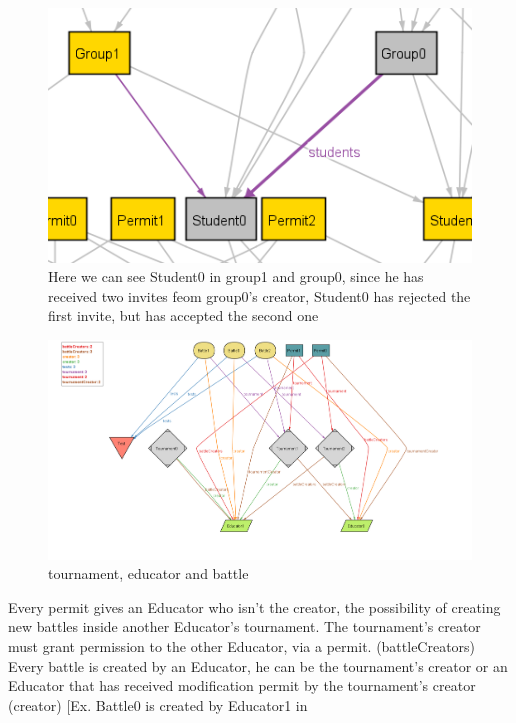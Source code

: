 \documentclass{article}
\begin{document}
{\begin{figure}[H]
\end{figure}
\begin{figure}[H]
    \centering
    \includegraphics{images/ALLOY/students.png}
    \caption{Here we can see Student0 in group1 and group0, since he has received two invites feom group0's creator, Student0 has rejected the first invite, but has accepted the second one}
    \label{fig:receivingAcceptingRefusingInvite}
\end{figure}
\newpage
\begin{figure}[H]
    \centering
    \hspace*{-4cm}\includegraphics[scale=0.59]{images/ALLOY/AlloyTournament.png}
    \caption{tournament, educator and battle}
    \label{fig:tournament, Educator and battle}
\end{figure}
\color{red}
Every permit gives an Educator who isn't the creator, the possibility of creating new battles inside another Educator's tournament.
The tournament's creator must grant permission to the other Educator, via a permit. (battleCreators)\\
\color{orange}
Every battle is created by an Educator, he can be the tournament's creator or an Educator that has received 
modification permit by the tournament's creator (creator) [Ex. Battle0 is created by Educator1 in 
}
\end{document}
